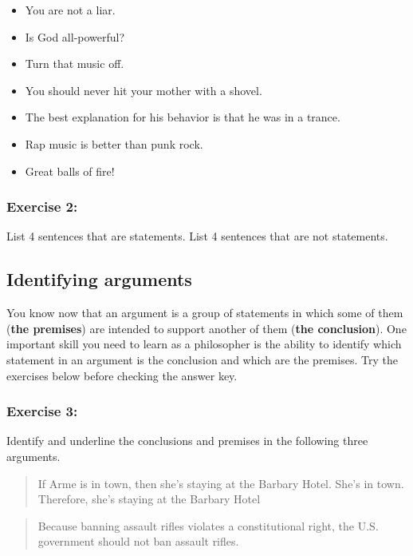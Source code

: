 \documentclass[]{article}
\providecommand{\tightlist}{%
  \setlength{\itemsep}{0pt}\setlength{\parskip}{0pt}}
\begin{document}
\begin{itemize}
\tightlist
\item
  You are not a liar.
\item
  Is God all-powerful?
\item
  Turn that music off.
\item
  You should never hit your mother with a shovel.
\item
  The best explanation for his behavior is that he was in a trance.
\item
  Rap music is better than punk rock.
\item
  Great balls of fire!
\end{itemize}

\subsubsection{Exercise 2:}\label{exercise-2}

List 4 sentences that are statements. List 4 sentences that are not
statements.

\subsection{Identifying arguments}\label{identifying-arguments}

You know now that an argument is a group of statements in which some of
them (\textbf{the premises}) are intended to support another of them
(\textbf{the conclusion}). One important skill you need to learn as a
philosopher is the ability to identify which statement in an argument is
the conclusion and which are the premises. Try the exercises below
before checking the answer key.

\subsubsection{Exercise 3:}\label{exercise-3}

Identify and underline the conclusions and premises in the following
three arguments.

\begin{quote}
If Arme is in town, then she's staying at the Barbary Hotel. She's in
town. Therefore, she's staying at the Barbary Hotel
\end{quote}

\begin{quote}
Because banning assault rifles violates a constitutional right, the U.S.
government should not ban assault rifles.
\end{quote}
\end{document}
